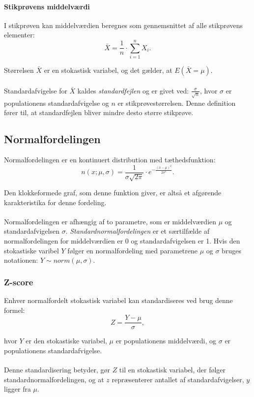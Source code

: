 \paragraph{Stikprøvens middelværdi} I stikprøven kan middelværdien beregnes som gennemsnittet af alle stikprøvens elementer:
$$\bar{X}=\frac{1}{n} \cdot \sum_{i=1}^{n} X_i.$$

\noindent Størrelsen $\bar{X}$ er en stokastisk variabel, og det gælder, at $E(\bar{X}=\mu)$.
\\
\\
\noindent Standardafvigelse for $\bar{X}$ kaldes \emph{standardfejlen} og er givet ved: $\frac{\sigma}{\sqrt{n}}$, hvor $\sigma$ er populationens standardafvigelse og $n$ er stikprøvestørrelsen. Denne definition fører til, at standardfejlen bliver mindre desto større stikprøve.


\subsection{Normalfordelingen}
Normalfordelingen er en kontinuert distribution med tæthedsfunktion:
$$n(x;\mu, \sigma)=\frac{1}{\sigma\sqrt{2\pi}} \cdot e^{-\frac{(x-\mu)^2}{2\sigma^2}}.$$

\noindent Den klokkeformede graf, som denne funktion giver, er altså et afgørende karakteristika for denne fordeling.
\\
\\
\noindent Normalfordelingen er afhængig af to parametre, som er middelværdien $\mu$ og standardafvigelsen $\sigma$.
\emph{Standardnormalfordelingen} er et særtilfælde af normalfordelingen for middelværdien er 0 og standardafvigelsen er 1.
Hvis den stokastiske varibel $Y$ følger en normalfordeling med parametrene $\mu$ og $\sigma$ bruges notationen:
$Y \sim norm(\mu,\sigma)$.

\subsubsection{Z-score}
Enhver normalfordelt stokastisk variabel kan standardiseres ved brug denne formel:
$$Z=\frac{Y-\mu}{\sigma},$$

\noindent hvor $Y$ er den stokastiske variabel, $\mu$ er populationens middelværdi, og $\sigma$ er populationens standardafvigelse.
\\
\\
\noindent Denne standardisering betyder, gør $Z$ til en stokastisk variabel, der følger standardnormalfordelingen, og at $z$ repræsenterer antallet af standardafvigelser, $y$ ligger fra $\mu$. 

